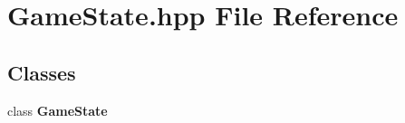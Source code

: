 \section{Game\-State.\-hpp File Reference}
\label{_game_state_8hpp}
\subsection*{Classes}
\begin{DoxyCompactItemize}
\item 
class {\bf Game\-State}
\end{DoxyCompactItemize}
